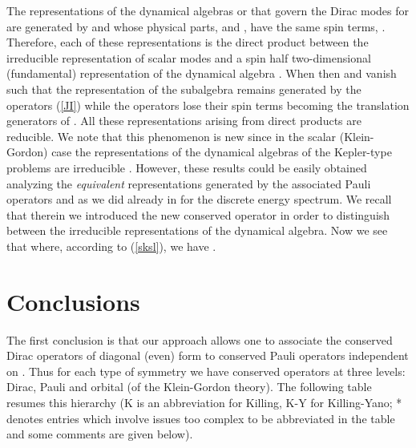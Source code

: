 \documentclass[a4paper,12pt]{article}
\begin{document}
The representations of the dynamical algebras \coordHE{} or \coordHE{} that 
govern the Dirac modes for \coordHE{} are generated by \coordHE{} 
and \coordHE{} \cite{CV4} whose physical parts, \coordHE{} and 
\coordHE{}, have the same spin terms, \coordHE{}. 
Therefore,  each of these representations is the direct product between 
the irreducible representation of scalar modes and a spin half 
two-dimensional (fundamental) representation of the dynamical algebra 
\cite{CV4}. When \coordHE{} then \coordHE{} and \coordHE{} vanish  such that 
the representation of the subalgebra \coordHE{} remains 
generated by the operators (\ref{JI}) while the operators  
\coordHE{} lose their spin terms becoming the translation 
generators of \coordHE{}. All these representations arising from direct 
products are reducible. We note that this phenomenon is new since in 
the scalar (Klein-Gordon) case the representations of the dynamical 
algebras of the Kepler-type problems are irreducible \cite{GRFH}.  
However, these results could be easily obtained analyzing the 
{\em equivalent} representations generated by the associated Pauli 
operators \coordHE{} and \coordHE{}  as we did already in \cite{CV4} for 
the discrete energy spectrum.   We recall that therein we introduced 
the new conserved operator \coordHE{}  
in order to distinguish between the irreducible representations of the 
\coordHE{} dynamical algebra. Now we see that 
\coordHE{} where, according to 
(\ref{sksl}), we have \coordHE{}. 

\section{Conclusions}

The first conclusion is that our approach allows one to associate the 
conserved Dirac operators of diagonal (even) form to conserved Pauli 
operators independent on \coordHE{}. Thus for each type of symmetry we have 
conserved operators at three levels: Dirac, Pauli and orbital (of the 
Klein-Gordon theory). 
The following table resumes this hierarchy (K is an abbreviation for 
Killing, K-Y for Killing-Yano; * denotes entries which involve issues 
too complex to be abbreviated in the table and some comments are given 
below).
\end{document}
